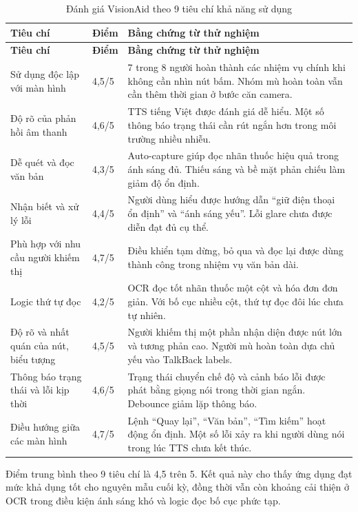 \documentclass[a4paper,13pt]{report}
\begin{document}
\begin{longtable}{p{}p{}p{}}
\caption{Đánh giá VisionAid theo 9 tiêu chí khả năng sử dụng} \label{tab:usability-criteria} \\
\toprule
\textbf{Tiêu chí} & \textbf{Điểm} & \textbf{Bằng chứng từ thử nghiệm} \\
\midrule
\endfirsthead
\toprule
\textbf{Tiêu chí} & \textbf{Điểm} & \textbf{Bằng chứng từ thử nghiệm} \\
\midrule
\endhead
Sử dụng độc lập với màn hình & 4,5/5 & 7 trong 8 người hoàn thành các nhiệm vụ chính khi không cần nhìn nút bấm. Nhóm mù hoàn toàn vẫn cần thêm thời gian ở bước căn camera. \\ \hline
Độ rõ của phản hồi âm thanh & 4,6/5 & TTS tiếng Việt được đánh giá dễ hiểu. Một số thông báo trạng thái cần rút ngắn hơn trong môi trường nhiều nhiễu. \\ \hline
Dễ quét và đọc văn bản & 4,3/5 & Auto-capture giúp đọc nhãn thuốc hiệu quả trong ánh sáng đủ. Thiếu sáng và bề mặt phản chiếu làm giảm độ ổn định. \\ \hline
Nhận biết và xử lý lỗi & 4,4/5 & Người dùng hiểu được hướng dẫn ``giữ điện thoại ổn định'' và ``ánh sáng yếu''. Lỗi glare chưa được diễn đạt đủ cụ thể. \\ \hline
Phù hợp với nhu cầu người khiếm thị & 4,7/5 & Điều khiển tạm dừng, bỏ qua và đọc lại được dùng thành công trong nhiệm vụ văn bản dài. \\ \hline
Logic thứ tự đọc & 4,2/5 & OCR đọc tốt nhãn thuốc một cột và hóa đơn đơn giản. Với bố cục nhiều cột, thứ tự đọc đôi lúc chưa tự nhiên. \\ \hline
Độ rõ và nhất quán của nút, biểu tượng & 4,5/5 & Người khiếm thị một phần nhận diện được nút lớn và tương phản cao. Người mù hoàn toàn dựa chủ yếu vào TalkBack labels. \\ \hline
Thông báo trạng thái và lỗi kịp thời & 4,6/5 & Trạng thái chuyển chế độ và cảnh báo lỗi được phát bằng giọng nói trong thời gian ngắn. Debounce giảm lặp thông báo. \\ \hline
Điều hướng giữa các màn hình & 4,7/5 & Lệnh ``Quay lại'', ``Văn bản'', ``Tìm kiếm'' hoạt động ổn định. Một số lỗi xảy ra khi người dùng nói trong lúc TTS chưa kết thúc. \\
\bottomrule
\end{longtable}

Điểm trung bình theo 9 tiêu chí là 4,5 trên 5. Kết quả này cho thấy ứng dụng đạt mức khả dụng tốt cho nguyên mẫu cuối kỳ, đồng thời vẫn còn khoảng cải thiện ở OCR trong điều kiện ánh sáng khó và logic đọc bố cục phức tạp.
\end{document}
